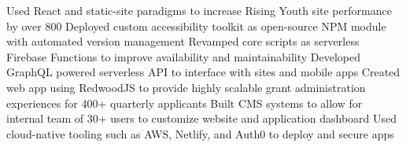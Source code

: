 Used React and static-site paradigms to increase Rising Youth site performance by over 800%
Deployed custom accessibility toolkit as open-source NPM module with automated version management
Revamped core scripts as serverless Firebase Functions to improve availability and maintainability
Developed GraphQL powered serverless API to interface with sites and mobile apps
Created web app using RedwoodJS to provide highly scalable grant administration experiences for 400+ quarterly applicants
Built CMS systems to allow for internal team of 30+ users to customize website and application dashboard
Used cloud-native tooling such as AWS, Netlify, and Auth0 to deploy and secure apps